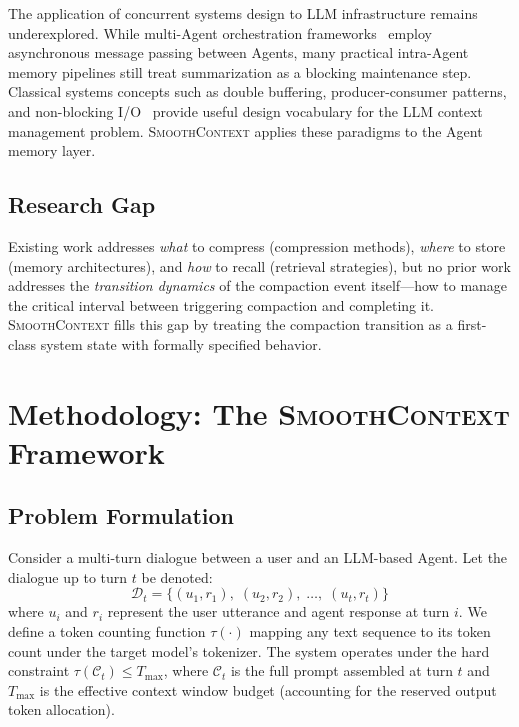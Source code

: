 \documentclass[10pt,twocolumn]{article}
\newcommand{\sys}{\textsc{SmoothContext}}
\newcommand{\Dtok}{\tau}
\newcommand{\Tmax}{T_{\max}}
\begin{document}
The application of concurrent systems design to LLM infrastructure remains underexplored. While multi-Agent orchestration frameworks~\cite{wu2023autogen} employ asynchronous message passing between Agents, many practical intra-Agent memory pipelines still treat summarization as a blocking maintenance step. Classical systems concepts such as double buffering, producer-consumer patterns, and non-blocking I/O~\cite{tanenbaum2015modern, lamport1978time} provide useful design vocabulary for the LLM context management problem. \sys{} applies these paradigms to the Agent memory layer.

\subsection{Research Gap}

Existing work addresses \emph{what} to compress (compression methods), \emph{where} to store (memory architectures), and \emph{how} to recall (retrieval strategies), but no prior work addresses the \emph{transition dynamics} of the compaction event itself---how to manage the critical interval between triggering compaction and completing it. \sys{} fills this gap by treating the compaction transition as a first-class system state with formally specified behavior.


\section{Methodology: The \sys{} Framework}\label{sec:method}

\subsection{Problem Formulation}\label{sec:formulation}

Consider a multi-turn dialogue between a user and an LLM-based Agent. Let the dialogue up to turn $t$ be denoted:
\begin{equation}\label{eq:dialogue}
  \mathcal{D}_t = \bigl\{(u_1, r_1),\; (u_2, r_2),\; \ldots,\; (u_t, r_t)\bigr\}
\end{equation}
where $u_i$ and $r_i$ represent the user utterance and agent response at turn $i$. We define a token counting function $\Dtok(\cdot)$ mapping any text sequence to its token count under the target model's tokenizer. The system operates under the hard constraint $\Dtok(\mathcal{C}_t) \leq \Tmax$, where $\mathcal{C}_t$ is the full prompt assembled at turn $t$ and $\Tmax$ is the effective context window budget (accounting for the reserved output token allocation).
\end{document}
